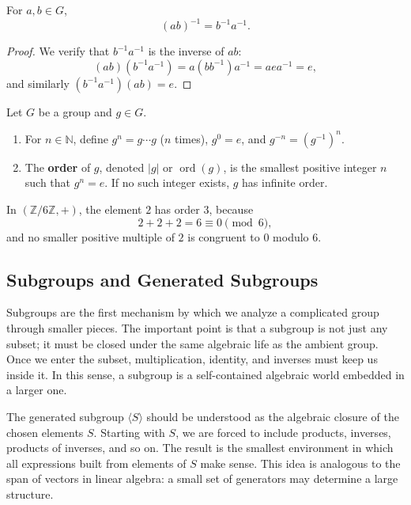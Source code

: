 \begin{proposition}
For $a,b\in G$,
\[
    (ab)^{-1}=b^{-1}a^{-1}.
\]
\end{proposition}

\begin{proof}
We verify that $b^{-1}a^{-1}$ is the inverse of $ab$:
\[
    (ab)(b^{-1}a^{-1})=a(bb^{-1})a^{-1}=aea^{-1}=e,
\]
and similarly $(b^{-1}a^{-1})(ab)=e$.
\end{proof}

\begin{definition}
Let $G$ be a group and $g\in G$.
\begin{enumerate}
    \item For $n\in\mathbb{N}$, define $g^n=g\cdots g$ ($n$ times), $g^0=e$, and $g^{-n}=(g^{-1})^n$.
    \item The \textbf{order} of $g$, denoted $|g|$ or $\operatorname{ord}(g)$, is the smallest positive integer $n$ such that $g^n=e$. If no such integer exists, $g$ has infinite order.
\end{enumerate}
\end{definition}

\begin{example}
In $(\mathbb{Z}/6\mathbb{Z},+)$, the element $2$ has order $3$, because
\[
    2+2+2=6\equiv 0\pmod 6,
\]
and no smaller positive multiple of $2$ is congruent to $0$ modulo $6$.
\end{example}

\subsection{Subgroups and Generated Subgroups}


Subgroups are the first mechanism by which we analyze a complicated group through smaller pieces. The important point is that a subgroup is not just any subset; it must be closed under the same algebraic life as the ambient group. Once we enter the subset, multiplication, identity, and inverses must keep us inside it. In this sense, a subgroup is a self-contained algebraic world embedded in a larger one.

The generated subgroup $\langle S\rangle$ should be understood as the algebraic closure of the chosen elements $S$. Starting with $S$, we are forced to include products, inverses, products of inverses, and so on. The result is the smallest environment in which all expressions built from elements of $S$ make sense. This idea is analogous to the span of vectors in linear algebra: a small set of generators may determine a large structure.

